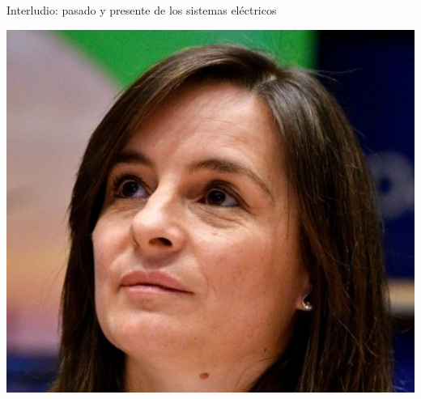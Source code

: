 \documentclass[aspectratio=169, usenames,svgnames,dvipsnames]{beamer}
\begin{document}
\begin{frame}{Interludio: \hspace{8mm}pasado y presente de los sistemas eléctricos}
\begin{minipage}[c]{0.3\linewidth}
\begin{center}
            \vspace{3mm}
            \includegraphics[width=1\linewidth]{../figs/vera_silva.jpg}
        \end{center}
    \end{minipage}
\end{frame}

\end{document}
